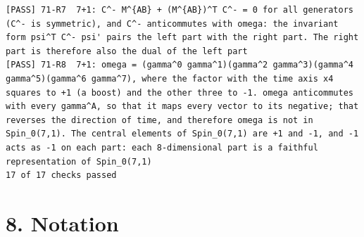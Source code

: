 \documentclass[
  10pt,
]{article}
\begin{document}
\begin{verbatim}
[PASS] 71-R7  7+1: C^- M^{AB} + (M^{AB})^T C^- = 0 for all generators (C^- is symmetric), and C^- anticommutes with omega: the invariant form psi^T C^- psi' pairs the left part with the right part. The right part is therefore also the dual of the left part
[PASS] 71-R8  7+1: omega = (gamma^0 gamma^1)(gamma^2 gamma^3)(gamma^4 gamma^5)(gamma^6 gamma^7), where the factor with the time axis x4 squares to +1 (a boost) and the other three to -1. omega anticommutes with every gamma^A, so that it maps every vector to its negative; that reverses the direction of time, and therefore omega is not in Spin_0(7,1). The central elements of Spin_0(7,1) are +1 and -1, and -1 acts as -1 on each part: each 8-dimensional part is a faithful representation of Spin_0(7,1)
17 of 17 checks passed
\end{verbatim}

\hypertarget{notation}{%
\section{8. Notation}\label{notation}}
\end{document}
